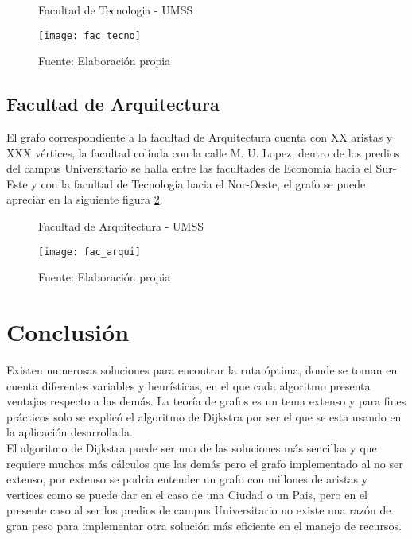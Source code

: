 \begin{figure}[H]
  \begin{center}
    \caption{Facultad de Tecnologia - UMSS}
    \label{fig:fac_tecno}
    \texttt{[image: fac\_tecno]}
    \caption*{Fuente: Elaboración propia}
  \end{center}
\end{figure}

\subsection{Facultad de Arquitectura}
\label{sub:facultad_arquitectura}

El grafo correspondiente a la facultad de Arquitectura cuenta con XX aristas y XXX vértices, la facultad colinda con la calle M. U. Lopez, dentro de los predios del campus Universitario se halla entre las facultades de Economía hacia el Sur-Este y con la facultad de Tecnología hacia el Nor-Oeste, el grafo se puede apreciar en la siguiente figura \ref{fig:fac_arqui}.

\begin{figure}[H]
  \begin{center}
    \caption{Facultad de Arquitectura - UMSS}
    \label{fig:fac_arqui}
    \texttt{[image: fac\_arqui]}
    \caption*{Fuente: Elaboración propia}
  \end{center}
\end{figure}


  \section{Conclusi\'on} %
  \label{sec:ruta_conclusion}

    Existen numerosas soluciones para encontrar la ruta óptima, donde se toman en cuenta diferentes variables y heurísticas, en el que  cada algoritmo presenta ventajas respecto a las demás.
    La teoría de grafos  es un tema extenso y para fines prácticos
    solo se explicó el algoritmo de Dijkstra por ser el que se esta usando en la aplicación desarrollada.\\

    El algoritmo de Dijkstra puede ser una de las soluciones más sencillas y que requiere muchos más cálculos que las demás pero el grafo implementado al no ser extenso, por extenso se podria entender un grafo con millones de aristas y vertices como se puede dar en el caso de una Ciudad o un Pais, pero en el presente caso al ser los predios de campus Universitario no existe una razón de gran peso para implementar otra solución más eficiente en el manejo de recursos.\\

